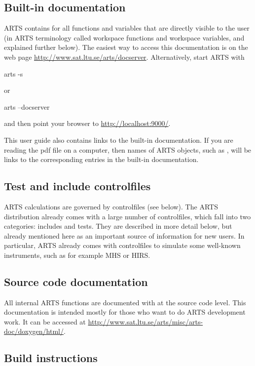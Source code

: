 \subsection{Built-in documentation}
\label{sec:built-in_doc}

ARTS contains  for all functions and
variables that are directly visible to the user (in ARTS terminology
called workspace functions and workspace variables, and explained
further below).  The easiest way to access this documentation is on
the web page
\url{http://www.sat.ltu.se/arts/docserver}. Alternatively, start ARTS
with
\begin{code}
  arts -s
\end{code}
or
\begin{code}
  arts --docserver
\end{code}
and then point your browser to \url{http://localhost:9000/}.

This user guide also contains links to the built-in
documentation.  If you are reading the pdf file on a computer, then
names of ARTS objects, such as , will be links to
the corresponding entries in the built-in documentation. 

\subsection{Test and include controlfiles}

ARTS calculations are governed by controlfiles (see below).  The ARTS
distribution already comes with a large number of controlfiles, which
fall into two categories: includes and tests.  They are described in
more detail below, but already mentioned here as an important source
of information for new users.  In particular, ARTS already comes with
controlfiles to simulate some well-known instruments, such as for
example MHS or HIRS.

\subsection{Source code documentation}

All internal ARTS functions are documented with  at the source
code level.  This documentation is intended mostly for those who want
to do ARTS development work.  It can be accessed at
\url{http://www.sat.ltu.se/arts/misc/arts-doc/doxygen/html/}. 

\subsection{Build instructions}

